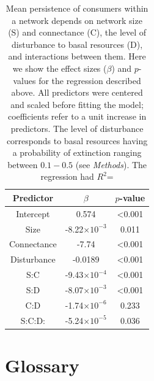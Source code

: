 \documentclass[12pt]{article}
\begin{document}
\begin{spacing}{2.0}
    \begin{table}[hb!]
        \caption{Mean persistence of consumers within a network depends on network size (S) and connectance (C), the level of disturbance to basal resources (D), and interactions between them. Here we show the effect sizes ($\beta$) and $p$-values for the regression described above. All predictors were centered and scaled before fitting the model; coefficients refer to a unit increase in predictors. The level of disturbance corresponds to basal resources having a probability of extinction ranging between $0.1 - 0.5$ (see \emph{Methods}). The regression had $R^2$=
        }
        \label{tab:per_vs_SC}
        \centering
        \begin{tabular}{c|c c |}
            Predictor & $\beta$ & $p$-value \\
            \hline
            Intercept & 0.574 & \textless0.001 \\
            Size & -8.22$\times10^{-3}$  & 0.011 \\
            Connectance & -7.74 & \textless0.001 \\
            Disturbance & -0.0189 & \textless0.001 \\
            S:C & -9.43$\times10^{-4}$ & \textless0.001 \\
            S:D & -8.07$\times10^{-3}$ & \textless0.001 \\
            C:D & -1.74$\times10^{-6}$ & 0.233 \\
            S:C:D: & -5.24$\times10^{-5}$ & 0.036 \\
        \end{tabular}
    \end{table}

\clearpage

\section{Glossary}


\end{spacing}
\end{document}
